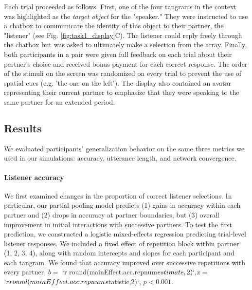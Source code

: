 \documentclass[11pt, floatsintext]{apa6}
\begin{document}
Each trial proceeded as follows.
First, one of the four tangrams in the context was highlighted as the \emph{target object} for the "speaker." 
They were instructed to use a chatbox to communicate the identity of this object to their partner, the "listener" (see Fig. \ref{fig:task1_display}C).
The listener could reply freely through the chatbox but was asked to ultimately make a selection from the array. 
Finally, both participants in a pair were given full feedback on each trial about their partner's choice and received bonus payment for each correct response. 
The order of the stimuli on the screen was randomized on every trial to prevent the use of spatial cues (e.g. 'the one on the left').
The display also contained an avatar representing their current partner to emphasize that they were speaking to the same partner for an extended period.

\subsection{Results}

We evaluated participants' generalization behavior on the same three metrics we used in our simulations: accuracy, utterance length, and network convergence.

\paragraph{Listener accuracy}

We first examined changes in the proportion of correct listener selections.
In particular, our partial pooling model predicts (1) gains in accuracy within each partner and (2) drops in accuracy at partner boundaries, but (3) overall improvement in initial interactions with successive partners.
To test the first prediction, we constructed a logistic mixed-effects regression predicting trial-level listener responses. 
We included a fixed effect of repetition block within partner (1, 2, 3, 4), along with random intercepts and slopes for each participant and each tangram. 
We found that accuracy improved over successive repetitions with every partner, $b =$ `r round(mainEffect.acc.repnum$estimate,2)`, $z =$ `r round(mainEffect.acc.repnum$statistic,2)`, $p<0.001$.
\end{document}
